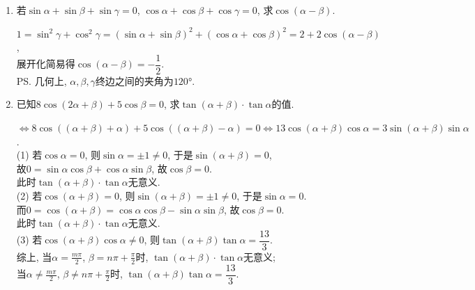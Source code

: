 \begin{enumerate}
\item 若$\sin\alpha+\sin\beta+\sin\gamma=0$, $\cos\alpha+\cos\beta+\cos\gamma=0$, 求$\cos\left(\alpha-\beta\right)$. 
\begin{jieda}
$1=\sin^2\gamma+\cos^2\gamma=\left(\sin\alpha+\sin\beta\right)^2+\left(\cos\alpha+\cos\beta\right)^2=2+2\cos\left(\alpha-\beta\right)$, \\
展开化简易得$\cos\left(\alpha-\beta\right)=-\dfrac{1}{2}$. \\
\ps 几何上, $\alpha,\beta,\gamma$终边之间的夹角为$\ang{120}$. 
\end{jieda}

\item 已知$8\cos\left(2\alpha+\beta\right)+5\cos\beta=0$, 求$\tan\left(\alpha+\beta\right)\cdot\tan\alpha$的值. 
\begin{jieda}
$\iff 8\cos\left(\left(\alpha+\beta\right)+\alpha\right)+5\cos\left(\left(\alpha+\beta\right)-\alpha\right)=0\iff 13\cos\left(\alpha+\beta\right)\cos\alpha=3\sin\left(\alpha+\beta\right)\sin\alpha$. \\
(1) 若$\cos\alpha=0$, 则$\sin\alpha=\pm1\neq 0$, 于是$\sin\left(\alpha+\beta\right)=0$, \\
故$0=\sin\alpha\cos\beta+\cos\alpha\sin\beta$, 故$\cos\beta=0$. \\
此时$\tan\left(\alpha+\beta\right)\cdot\tan\alpha$无意义. \\
(2) 若$\cos\left(\alpha+\beta\right)=0$, 则$\sin\left(\alpha+\beta\right)=\pm1\neq0$, 于是$\sin\alpha=0$. \\
而$0=\cos\left(\alpha+\beta\right)=\cos\alpha\cos\beta-\sin\alpha\sin\beta$, 故$\cos\beta=0$. \\
此时$\tan\left(\alpha+\beta\right)\cdot\tan\alpha$无意义. \\
(3) 若$\cos\left(\alpha+\beta\right)\cos\alpha\neq 0$, 则$\tan\left(\alpha+\beta\right)\tan\alpha=\dfrac{13}{3}$. \\
综上, 当$\alpha=\frac{m\pi}{2}$, $\beta=n\pi+\frac{\pi}{2}$时, $\tan\left(\alpha+\beta\right)\cdot\tan\alpha$无意义; \\
当$\alpha\neq\frac{m\pi}{2}$, $\beta \neq n\pi+\frac{\pi}{2}$时, $\tan\left(\alpha+\beta\right)\tan\alpha=\dfrac{13}{3}$. 
\end{jieda}

\end{enumerate}

\clearpage

